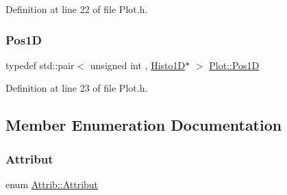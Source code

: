 Definition at line 22 of file Plot.\+h.

\mbox{\label{classPlot_ac411abcbcce315d4e77094393e6ca418}} 
\subsubsection{\texorpdfstring{Pos1D}{Pos1D}}
{\footnotesize\ttfamily typedef std\+::pair$<$ unsigned int , \hyperlink{classHisto1D}{Histo1D}$\ast$ $>$ \hyperlink{classPlot_ac411abcbcce315d4e77094393e6ca418}{Plot\+::\+Pos1D}\hspace{0.3cm}{\ttfamily [private]}}



Definition at line 23 of file Plot.\+h.



\subsection{Member Enumeration Documentation}
\mbox{\label{classAttrib_a69e171d7cc6417835a5a306d3c764235}} 
\subsubsection{\texorpdfstring{Attribut}{Attribut}}
{\footnotesize\ttfamily enum \hyperlink{classAttrib_a69e171d7cc6417835a5a306d3c764235}{Attrib\+::\+Attribut}\hspace{0.3cm}{\ttfamily [inherited]}}

